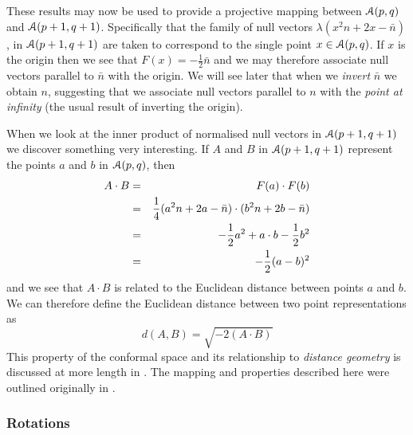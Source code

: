 These results may now be used to provide a projective mapping
between ${\mathcal{A}}(p,q)$ and  ${\mathcal{A}}(p+1,q+1)$. Specifically that the
family of null vectors $\lambda(x^2n + 2x - \bar{n})$,
in ${\mathcal{A}}(p+1,q+1)$ are taken to correspond to the
single point $x\in {\mathcal{A}}(p,q)$. If $x$ is the origin
then we see that $F(x) = -\frac{1}{2}\bar{n}$ and we may therefore associate
null vectors parallel to $\bar{n}$ with the origin. 
We will see later that when we \emph{invert} $\bar{n}$ 
we obtain $n$, suggesting
that we associate null vectors parallel to $n$ with the 
\emph{point at infinity} (the usual result of inverting the origin).

When we look at the inner product of normalised null vectors in
${\mathcal{A}}(p+1,q+1)$ we discover something very
interesting. If $A$ and $B$ in ${\mathcal{A}}(p+1,q+1)$
represent the points $a$ and $b$ in ${\mathcal{A}}(p,q)$, then
%
\begin{eqnarray} A\cdot B &  =  &  F(a)\cdot F(b) \nonumber \\
            &  =  &  \frac{1}{4}(a^2n + 2a - \bar{n})\cdot (b^2n + 2b -
            \bar{n})\nonumber \\
            & = &    -\frac{1}{2}a^2 + a\cdot b - \frac{1}{2}b^2 \nonumber \\
            &  =  &  -\frac{1}{2}(a-b)^2
\end{eqnarray}
%
and we see that $A\cdot B$ is related to the Euclidean
distance between points $a$ and $b$. 
We can therefore define the Euclidean distance between two
point representations as
\begin{equation}
d(A,B) = \sqrt{-2 (A \cdot B) }
            \label{distance}
\end{equation}
This property of the
conformal space and its relationship to \emph{distance geometry}
\cite{distgeom} is discussed at more length in \cite{oldwine}. 
The mapping and properties described here were outlined
originally in \cite{hestenes}.

\subsubsection{Rotations}

